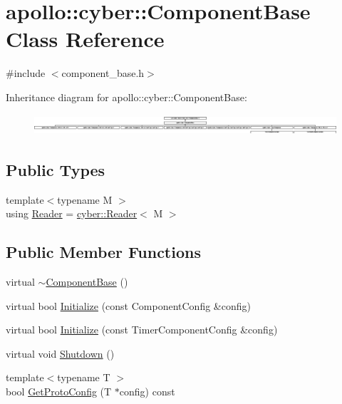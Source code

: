 \hypertarget{classapollo_1_1cyber_1_1ComponentBase}{\section{apollo\-:\-:cyber\-:\-:Component\-Base Class Reference}
\label{classapollo_1_1cyber_1_1ComponentBase}
}


{\ttfamily \#include $<$component\-\_\-base.\-h$>$}

Inheritance diagram for apollo\-:\-:cyber\-:\-:Component\-Base\-:\begin{figure}[H]
\begin{center}
\leavevmode
\includegraphics[height=0.774818cm]{classapollo_1_1cyber_1_1ComponentBase}
\end{center}
\end{figure}
\subsection*{Public Types}
\begin{DoxyCompactItemize}
\item 
{\footnotesize template$<$typename M $>$ }\\using \hyperlink{classapollo_1_1cyber_1_1ComponentBase_afca61d12e5699b85020c0d4250e132f9}{Reader} = \hyperlink{classapollo_1_1cyber_1_1Reader}{cyber\-::\-Reader}$<$ M $>$
\end{DoxyCompactItemize}
\subsection*{Public Member Functions}
\begin{DoxyCompactItemize}
\item 
virtual \hyperlink{classapollo_1_1cyber_1_1ComponentBase_a1a6c3712519c64c9f652c9f7bd62814a}{$\sim$\-Component\-Base} ()
\item 
virtual bool \hyperlink{classapollo_1_1cyber_1_1ComponentBase_a234ab17fb5f504179b9f49d344e72882}{Initialize} (const Component\-Config \&config)
\item 
virtual bool \hyperlink{classapollo_1_1cyber_1_1ComponentBase_a37d357e2eceb17811db7a7acaae59047}{Initialize} (const Timer\-Component\-Config \&config)
\item 
virtual void \hyperlink{classapollo_1_1cyber_1_1ComponentBase_a6d584e0ab4d990fdad46f845d2e43167}{Shutdown} ()
\item 
{\footnotesize template$<$typename T $>$ }\\bool \hyperlink{classapollo_1_1cyber_1_1ComponentBase_a6757b622cfa042adc580dc8a89a668f8}{Get\-Proto\-Config} (T $\ast$config) const 
\end{DoxyCompactItemize}
